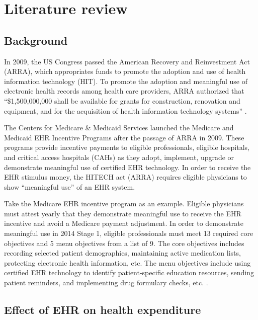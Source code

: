 \documentclass[12pt]{report}
\begin{document}
\chapter{Literature review}
\label{chapter:lit}
\section{Background}

In 2009, the US Congress passed the American Recovery and Reinvestment Act (ARRA), which appropriates funds to promote the adoption and use of health information technology (HIT). To promote the adoption and meaningful use of electronic health records among health care providers, ARRA authorized that ``\$1,500,000,000 shall be available for grants for construction, renovation and equipment, and for the acquisition of health information technology systems'' \citep{AARALaw}. 

The Centers for Medicare \& Medicaid Services launched the Medicare and Medicaid EHR Incentive Programs after the passage of ARRA in 2009. These programs provide incentive payments to eligible professionals, eligible hospitals, and critical access hospitals (CAHs) as they adopt, implement, upgrade or demonstrate meaningful use of certified EHR technology. In order to receive the EHR stimulus money, the HITECH act (ARRA) requires eligible physicians to show ``meaningful use'' of an EHR system.

Take the Medicare EHR incentive program as an example. Eligible physicians must attest yearly that they demonstrate meaningful use to receive the EHR incentive and avoid a Medicare payment adjustment. In order to demonstrate meaningful use in 2014 Stage 1, eligible professionals must meet 13 required core objectives and 5 menu objectives from a list of 9. The core objectives includes recording selected patient demographics, maintaining active medication lists, protecting electronic health information, etc. The menu objectives include using certified EHR technology to identify patient-specific education resources, sending patient reminders, and implementing drug formulary checks, etc. \citep{stage1}.

\section{Effect of EHR on health expenditure}
\end{document}
